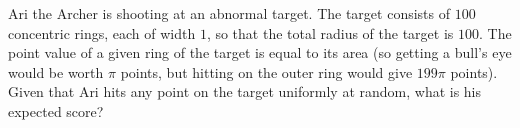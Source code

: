 Ari the Archer is shooting at an abnormal target. The target consists of $100$ concentric rings, each of width $1$, so that the total radius of the target is $100$. The point value of a given ring of the target is equal to its area (so getting a bull's eye would be worth $\pi$ points, but hitting on the outer ring would give $199\pi$ points). Given that Ari hits any point on the target uniformly at random, what is his expected score?